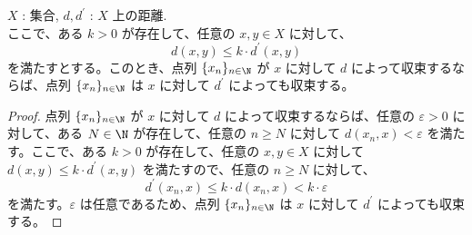 \documentclass[article,paper=a4paper]{jlreq}
\begin{document}
\begin{lem}\label{lem:distance-comparison}
    \quad $X$ : 集合, $d, d^{\prime}$ : $X$ 上の距離.\\
    ここで、ある $k > 0$ が存在して、任意の $x,y \in X$ に対して、
    \[d(x,y) \leq k\cdot d^{\prime}(x,y)\]
    を満たすとする。このとき、点列 $\{x_n\}_{n \in \N}$ が $x$ に対して $d$ によって収束するならば、点列 $\{x_n\}_{n \in \N}$ は $x$ に対して $d^{\prime}$ によっても収束する。
\end{lem}

\begin{proof}
    点列 $\{x_n\}_{n \in \N}$ が $x$ に対して $d$ によって収束するならば、任意の $\varepsilon > 0$ に対して、ある $N \in \N$ が存在して、任意の $n \geq N$ に対して $d(x_n,x) < \varepsilon$ を満たす。ここで、ある $k > 0$ が存在して、任意の $x,y \in X$ に対して $d(x,y) \leq k\cdot d^{\prime}(x,y)$ を満たすので、任意の $n \geq N$ に対して、
    \[d^{\prime}(x_n,x) \leq k\cdot d(x_n,x) < k\cdot \varepsilon\]
    を満たす。$\varepsilon$ は任意であるため、点列 $\{x_n\}_{n \in \N}$ は $x$ に対して $d^{\prime}$ によっても収束する。
\end{proof}
\end{document}
